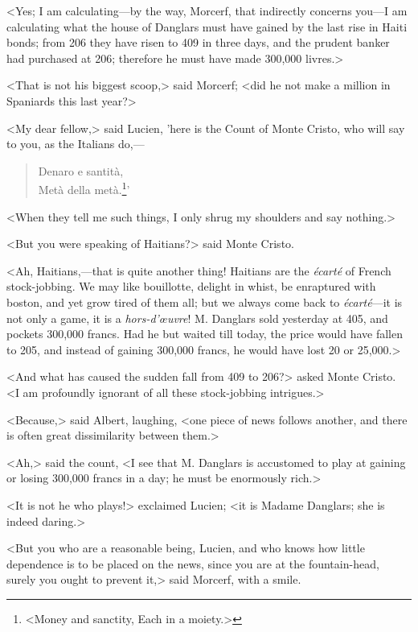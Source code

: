  <Yes; I am calculating—by the way, Morcerf, that indirectly concerns you—I am calculating what the house of Danglars must have gained by the last rise in Haiti bonds; from 206 they have risen to 409 in three days, and the prudent banker had purchased at 206; therefore he must have made 300,000 livres.> 

 <That is not his biggest scoop,> said Morcerf; <did he not make a million in Spaniards this last year?> 

 <My dear fellow,> said Lucien, 'here is the Count of Monte Cristo, who will say to you, as the Italians do,—  
 
 \begin{verse}
Denaro e santità,\\
Metà della metà.\footnote{<Money and sanctity, Each in a moiety.>}'
\end{verse}

 <When they tell me such things, I only shrug my shoulders and say nothing.> 

 <But you were speaking of Haitians?> said Monte Cristo. 

 <Ah, Haitians,—that is quite another thing! Haitians are the \textit{écarté} of French stock-jobbing. We may like bouillotte, delight in whist, be enraptured with boston, and yet grow tired of them all; but we always come back to \textit{écarté}—it is not only a game, it is a \textit{hors-d'œuvre}! M. Danglars sold yesterday at 405, and pockets 300,000 francs. Had he but waited till today, the price would have fallen to 205, and instead of gaining 300,000 francs, he would have lost 20 or 25,000.> 

 <And what has caused the sudden fall from 409 to 206?> asked Monte Cristo. <I am profoundly ignorant of all these stock-jobbing intrigues.> 

 <Because,> said Albert, laughing, <one piece of news follows another, and there is often great dissimilarity between them.> 

 <Ah,> said the count, <I see that M. Danglars is accustomed to play at gaining or losing 300,000 francs in a day; he must be enormously rich.> 

 <It is not he who plays!> exclaimed Lucien; <it is Madame Danglars; she is indeed daring.> 

 <But you who are a reasonable being, Lucien, and who knows how little dependence is to be placed on the news, since you are at the fountain-head, surely you ought to prevent it,> said Morcerf, with a smile. 

